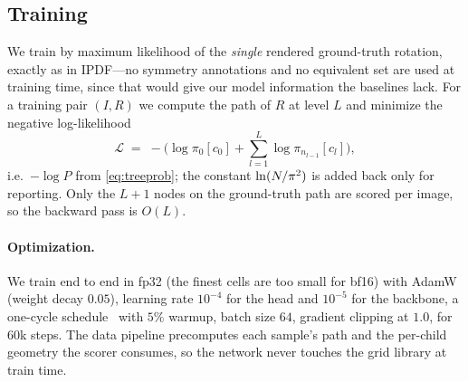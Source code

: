 \subsection{Training}
\label{sec:training}

We train by maximum likelihood of the \emph{single} rendered ground-truth
rotation, exactly as in IPDF---no symmetry annotations and no equivalent set are
used at training time, since that would give our model information the baselines
lack. For a training pair $(I, R)$ we compute the path of $R$ at level $L$ and
minimize the negative log-likelihood
\begin{equation}
  \mathcal{L} \;=\; -\Big(\log\pi_0[c_0] + \sum_{l=1}^{L}\log\pi_{n_{l-1}}[c_l]\Big),
  \label{eq:loss}
\end{equation}
i.e.\ $-\log P$ from \cref{eq:treeprob}; the constant $\ln(N/\pi^2)$ is added back
only for reporting. Only the $L{+}1$ nodes on the ground-truth path are scored
per image, so the backward pass is $O(L)$.

\paragraph{Optimization.}
We train end to end in fp32 (the finest cells are too small for bf16) with
AdamW~\cite{loshchilov2019adamw} (weight decay $0.05$), learning rate $10^{-4}$ for the head and
$10^{-5}$ for the backbone, a one-cycle schedule~\cite{smith2019onecycle} with $5\%$ warmup,
batch size $64$, gradient clipping at $1.0$, for $60$k steps. The data pipeline
precomputes each sample's path and the per-child geometry the scorer consumes, so
the network never touches the grid library at train time.

